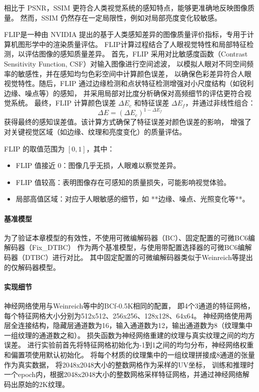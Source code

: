 相比于 PSNR，SSIM 更符合人类视觉系统的感知特点，能够更准确地反映图像质量。
然而，SSIM 仍然存在一定局限性，例如对局部亮度变化较敏感。

FLIP是一种由 NVIDIA 提出的基于人类感知差异的图像质量评价指标，专用于计算机图形学中的渲染质量评估。
FLIP计算过程结合了人眼视觉特性和局部特征检测，以评估图像的感知质量差异。
首先，FLIP 采用对比敏感度函数（Contrast Sensitivity Function, CSF）对输入图像进行空间滤波，
以模拟人眼对不同空间频率的敏感性，并在感知均匀色彩空间中计算颜色误差，
以确保色彩差异符合人眼视觉特性。随后，FLIP 通过边缘检测和点状特征检测增强对小尺度结构（如锐利边缘、噪点等）的感知，
并采用局部对比度分析确保对高频细节的评估更符合视觉系统。
最终，FLIP 计算颜色误差 $\Delta E_c$ 和特征误差 $\Delta E_f$，并通过非线性组合：
\begin{equation}
    \Delta E = (\Delta E_c)^{1 - \Delta E_f}
\end{equation}
获得最终的感知误差值。该计算方式确保了特征误差对颜色误差的影响，
增强了对关键视觉区域（如边缘、纹理和亮度变化）的质量评估。

FLIP 的取值范围为 $[0,1]$，其中：
\begin{itemize}
    \item FLIP 值接近 0：图像几乎无损，人眼难以察觉差异。
    \item FLIP 值较高：表明图像存在可感知的质量损失，可能影响视觉体验。
    \item 局部高值区域：对应于人眼敏感的细节，如 **边缘、噪点、光照变化等**。
\end{itemize}

\paragraph{基准模型}

为了验证本章模型的有效性，不使用可微编解码器（BC）、固定配置的可微BC6编解码器（Fix\_DTBC）
作为两个基准模型，与使用带配置选择器的可微BC6编解码器（DTBC）进行对比。
其中固定配置的可微编解码器类似于Weinreich等\cite{weinreich2024real}提出的仅解码器模型。

\paragraph{实现细节}

神经网络使用与Weinreich等\cite{weinreich2024real}中的BCf-0.5K相同的配置，
即4个3通道的特征网格，每个特征网格大小分别为512x512、256x256、128x128、64x64。
神经网络使用两层全连接结构，隐藏层通道数为16，输入通道数为12，输出通道数为8（纹理集中一组纹理的通道数之和）。
损失函数为神经网络重建的纹理与真实纹理之间的均方误差。
进行实验前首先将特征网格初始化为-1到1之间的均匀分布，神经网络权重和偏置项使用默认初始化。
将每个材质的纹理集中的一组纹理拼接成8通道的张量作为真实数据，
将2048x2048大小的整数网格作为采样的UV坐标，
训练和推理时一个epoch内，根据2048x2048大小的整数网格采样特征网格，并通过神经网络解码出原始的2K纹理。

